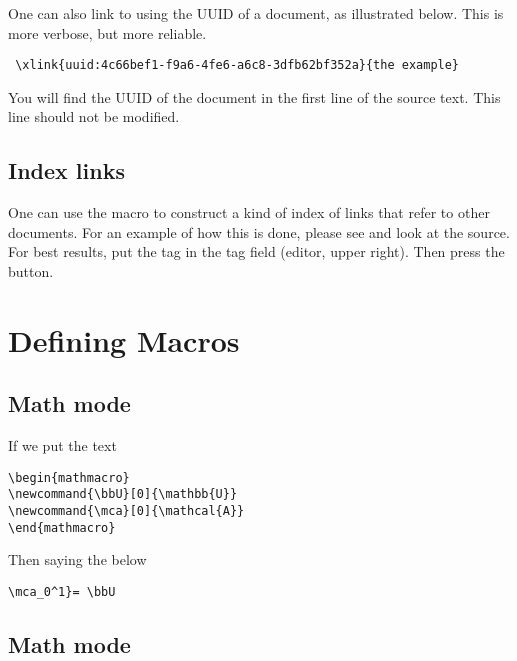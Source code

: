 One can also link to   using the UUID of a document, as illustrated below.  This is more verbose, but more reliable.


\begin{verbatim}
 \xlink{uuid:4c66bef1-f9a6-4fe6-a6c8-3dfb62bf352a}{the example}
\end{verbatim}


You will find the UUID of the document in the first line of the source text.  This line should not be modified.


\subsection{Index links}

One can use the  macro to construct a kind of index of links that refer to other documents.  For an example of how this is done, please see  and look at the source. For best results, put the tag  in the tag field (editor, upper right).  Then press the  button.

\section{Defining Macros}

\subsection{Math mode}

If we put the text

\begin{verbatim}
\begin{mathmacro}
\newcommand{\bbU}[0]{\mathbb{U}}
\newcommand{\mca}[0]{\mathcal{A}}
\end{mathmacro}
\end{verbatim}


\begin{mathmacro}
\newcommand{\bbU}[0]{\mathbb{U}}
\newcommand{\mca}[0]{\mathcal{A}}
\end{mathmacro}

Then saying the below

\begin{verbatim}
\mca_0^1}= \bbU
\end{verbatim}

\subsection{Math mode}

